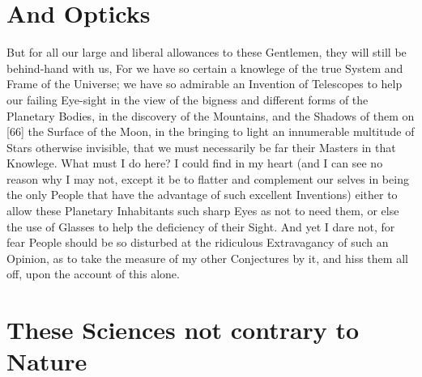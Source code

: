 \documentclass[letterpaper]{book}
\begin{document}
\section{And Opticks}

But for all our large and liberal allowances to these Gentlemen, they will
still be behind-hand with us, For we have so certain a knowlege of the
true System and Frame of the Universe; we have so admirable an Invention
of Telescopes to help our failing Eye-sight in the view of the bigness and
different forms of the Planetary Bodies, in the discovery of the Mountains,
and the Shadows of them on [66] the Surface of the Moon, in the bringing
to light an innumerable multitude of Stars otherwise invisible, that we must
necessarily be far their Masters in that Knowlege. What must I do here? I
could find in my heart (and I can see no reason why I may not, except it
be to flatter and complement our selves in being the only People that have
the advantage of such excellent Inventions) either to allow these Planetary
Inhabitants such sharp Eyes as not to need them, or else the use of Glasses
to help the deficiency of their Sight. And yet I dare not, for fear People
should be so disturbed at the ridiculous Extravagancy of such an Opinion,
as to take the measure of my other Conjectures by it, and hiss them all off,
upon the account of this alone.


\section{These Sciences not contrary to Nature}
\end{document}
